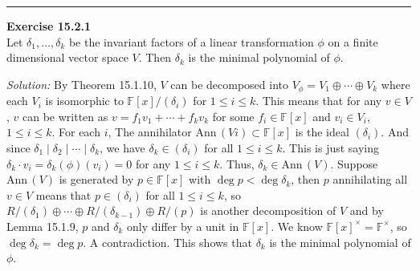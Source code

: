 \documentclass[a4paper, 12pt]{article}
\newenvironment{problem}[2][Exercise]
    { \begin{mdframed}[backgroundcolor=gray!20] \textbf{#1 #2} \\}
    {  \end{mdframed}}
\newenvironment{solution}
    {\textit{Solution:}}
    {}
\newcommand{\Ann}{\text{Ann}\,}
\begin{document}
\noindent\rule{7in}{2.8pt}
\begin{problem}{15.2.1}
Let \(\delta_1,\ldots,\delta_k\) be the invariant factors of a linear transformation \(\phi\) on a finite dimensional vector space \(V\). Then \(\delta_k\) is the minimal polynomial 
of \(\phi\).
\end{problem}
\begin{solution}
By Theorem 15.1.10, \(V\) can be decomposed into \(V_\phi=V_1\oplus \cdots \oplus V_k\) where each \(V_i\) is isomorphic to \(\mathbb{F}[x]/(\delta_i)\) for \(1\leq i\leq k\). This means that for any \(v\in V\), \(v\) can be written as 
\(v=f_1v_1+\cdots +f_kv_k\) for some \(f_i\in \mathbb{F}[x]\) and \(v_i\in V_i\), \(1\leq i\leq k\). For each \(i\), The annihilator \(\Ann(Vi)\subset \mathbb{F}[x]\) is the ideal \((\delta_i)\). And since \(\delta_1\mid \delta_2\mid \cdots\mid \delta_k\), we have 
\(\delta_k\in (\delta_i)\) for all \(1\leq i\leq k\). This is just saying \(\delta_k\cdot v_i=\delta_k(\phi)(v_i)=0\) for any \(1\leq i\leq k\). Thus, \(\delta_k\in \Ann(V)\). Suppose \(\Ann(V)\) is generated by \(p\in \mathbb{F}[x]\) with \(\deg p<\deg \delta_k\), then 
\(p\) annihilating all \(v\in V\) means that \(p\in (\delta_i)\) for all \(1\leq i\leq k\), so \(R/(\delta_1)\oplus \cdots \oplus R/(\delta_{k-1})\oplus R/(p)\) is another decomposition of \(V\) and by Lemma 15.1.9, \(p\) and \(\delta_k\) only differ by a unit in 
\(\mathbb{F}[x]\). We know \(\mathbb{F}[x]^{\times}=\mathbb{F}^{\times}\), so \(\deg \delta_k=\deg p\). A contradiction. This shows that \(\delta_k\) is the minimal polynomial of \(\phi\).
\end{solution}
\end{document}

